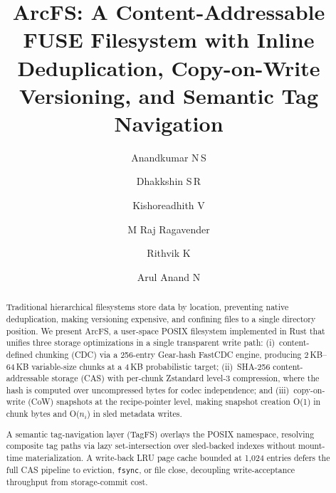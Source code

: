 \documentclass[5p,times]{elsarticle}
\begin{document}
\begin{frontmatter}

\title{ArcFS: A Content-Addressable FUSE Filesystem
       with Inline Deduplication, Copy-on-Write Versioning,
       and Semantic Tag Navigation}

\author[psg]{Anandkumar N\,S}

\author[psg]{Dhakkshin S\,R}

\author[psg]{Kishoreadhith V}

\author[psg]{M Raj Ragavender}

\author[psg]{Rithvik K}

\author[psg]{Arul Anand N}


\address[psg]{Department of Computer Science and Engineering,
  PSG College of Technology (Anna University),
  Coimbatore, Tamil Nadu -- 641\,004, India}

\begin{abstract}
Traditional hierarchical filesystems store data by location, preventing
native deduplication, making versioning expensive, and confining files to
a single directory position.  We present ArcFS, a user-space POSIX
filesystem implemented in Rust that unifies three storage optimizations in
a single transparent write path: (i)~content-defined chunking (CDC) via a
256-entry Gear-hash FastCDC engine, producing 2\,KB--64\,KB variable-size
chunks at a 4\,KB probabilistic target; (ii)~SHA-256 content-addressable
storage (CAS) with per-chunk Zstandard level-3 compression, where the hash
is computed over uncompressed bytes for codec independence; and
(iii)~copy-on-write (CoW) snapshots at the recipe-pointer level, making
snapshot creation O(1) in chunk bytes and O($n_i$) in sled metadata writes.

A semantic tag-navigation layer (TagFS) overlays the POSIX namespace,
resolving composite tag paths via lazy set-intersection over sled-backed
indexes without mount-time materialization.  A write-back LRU page cache
bounded at 1,024 entries defers the full CAS pipeline to eviction,
\texttt{fsync}, or file close, decoupling write-acceptance throughput from
storage-commit cost.


\end{abstract}
\end{frontmatter}
\end{document}
